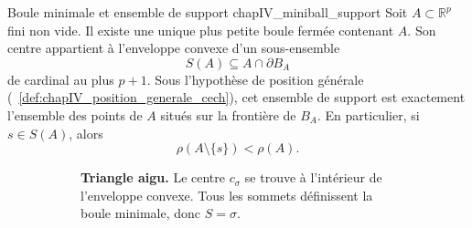 \begin{Resultat}{Boule minimale et ensemble de support \cite{Welzl1991, BoissonnatChazalYvinec}}{chapIV_miniball_support}
Soit $A\subset\mathbb R^p$ fini non vide. Il existe une unique plus petite boule fermée contenant $A$. Son centre appartient à l'enveloppe convexe d'un sous-ensemble
\[
    S(A)\subseteq A\cap\partial B_A
\]
de cardinal au plus $p+1$. Sous l'hypothèse de position générale (\Def~\ref{def:chapIV_position_generale_cech}), cet ensemble de support est exactement l'ensemble des points de $A$ situés sur la frontière de $B_A$. En particulier, si $s\in S(A)$, alors
\[
\boxed{
    \rho(A\setminus\{s\})<\rho(A).
    }
\]
\end{Resultat}

\begin{figure}[!h]
    \centering
    \begin{subfigure}[b]{0.48\textwidth}
        \centering
        \caption{\textbf{Triangle aigu.} Le centre $c_\sigma$ se trouve à l'intérieur de l'enveloppe convexe. Tous les sommets définissent la boule minimale, donc $S = \sigma$.}
        \label{fig:support_acutangle}
    \end{subfigure}
    \hfill
    \begin{subfigure}[b]{0.48\textwidth}
        \centering
\end{subfigure}
\end{figure}
